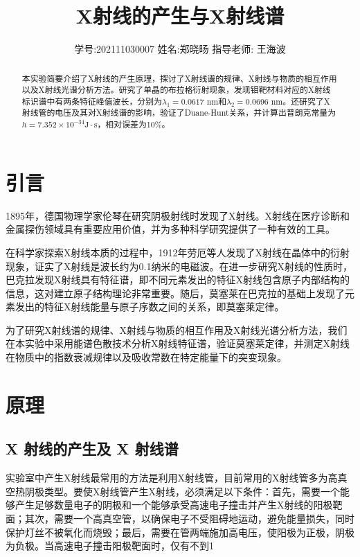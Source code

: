\documentclass[11pt,a4paper]{article}
\title{\vspace{-4cm}\Large X射线的产生与X射线谱}  %
\author{\kaishu 学号:202111030007 \hspace{1.5cm} 姓名:郑晓旸 \hspace{1.5cm} 指导老师: 王海波}   %
\date{}
\begin{document}
\maketitle

\begin{abstract}
    本实验简要介绍了X射线的产生原理，探讨了X射线谱的规律、X射线与物质的相互作用以及X射线光谱分析方法。研究了单晶的布拉格衍射现象，发现钼靶材料对应的X射线标识谱中有两条特征峰值波长，分别为$\lambda_1=0.0617$ nm和$\lambda_2=0.0696$ nm。还研究了X射线管的电压及其对X射线谱的影响，验证了Duane-Hunt关系，并计算出普朗克常量为$h=7.352\times10^{-34}\text{J}\cdot\text{s}$，相对误差为10\%。
	
\end{abstract}

\section{引言}
1895年，德国物理学家伦琴在研究阴极射线时发现了X射线。X射线在医疗诊断和金属探伤领域具有重要应用价值，并为多种科学研究提供了一种有效的工具。

在科学家探索X射线本质的过程中，1912年劳厄等人发现了X射线在晶体中的衍射现象，证实了X射线是波长约为0.1纳米的电磁波。在进一步研究X射线的性质时，巴克拉发现X射线具有特征谱，即不同元素发出的特征X射线包含原子内部结构的信息，这对建立原子结构理论非常重要。随后，莫塞莱在巴克拉的基础上发现了元素发出的特征X射线能量与原子序数之间的关系，即莫塞莱定律。

为了研究X射线谱的规律、X射线与物质的相互作用及X射线光谱分析方法，我们在本实验中采用能谱色散技术分析X射线特征谱，验证莫塞莱定律，并测定X射线在物质中的指数衰减规律以及吸收常数在特定能量下的突变现象。

\section{原理}
\subsection{X 射线的产生及 X 射线谱}
实验室中产生X射线最常用的方法是利用X射线管，目前常用的X射线管多为高真空热阴极类型。要使X射线管产生X射线，必须满足以下条件：首先，需要一个能够产生足够数量电子的阴极和一个能够承受高速电子撞击并产生X射线的阳极靶面；其次，需要一个高真空管，以确保电子不受阻碍地运动，避免能量损失，同时保护灯丝不被氧化而烧毁；最后，需要在管两端施加高电压，使阳极为正极，阴极为负极。当高速电子撞击阳极靶面时，仅有不到1%
\end{document}
